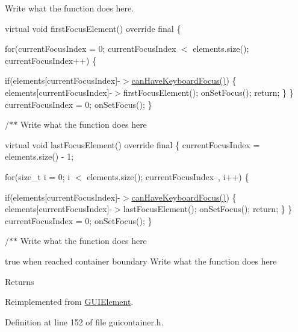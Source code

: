 Write what the function does here. 

virtual void first\+Focus\+Element() override final \{

for(current\+Focus\+Index = 0; current\+Focus\+Index $<$ elements.\+size(); current\+Focus\+Index++) \{

if(elements\mbox{[}current\+Focus\+Index\mbox{]}-\/$>$\hyperlink{classGUIContainer_a54bbf86cc92ce6518ccdc25a21b8e5f5}{can\+Have\+Keyboard\+Focus()}) \{ elements\mbox{[}current\+Focus\+Index\mbox{]}-\/$>$first\+Focus\+Element(); on\+Set\+Focus(); return; \} \} current\+Focus\+Index = 0; on\+Set\+Focus(); \}

/$\ast$$\ast$ Write what the function does here

virtual void last\+Focus\+Element() override final \{ current\+Focus\+Index = elements.\+size() -\/ 1;

for(size\+\_\+t i = 0; i $<$ elements.\+size(); current\+Focus\+Index--, i++) \{

if(elements\mbox{[}current\+Focus\+Index\mbox{]}-\/$>$\hyperlink{classGUIContainer_a54bbf86cc92ce6518ccdc25a21b8e5f5}{can\+Have\+Keyboard\+Focus()}) \{ elements\mbox{[}current\+Focus\+Index\mbox{]}-\/$>$last\+Focus\+Element(); on\+Set\+Focus(); return; \} \} current\+Focus\+Index = 0; on\+Set\+Focus(); \}

/$\ast$$\ast$ Write what the function does here

true when reached container boundary Write what the function does here

\begin{DoxyReturn}{Returns}

\end{DoxyReturn}


Reimplemented from \hyperlink{classGUIElement_a970e90bbb7db5de07708b0b2ef53d9e9}{G\+U\+I\+Element}.



Definition at line 152 of file guicontainer.\+h.


